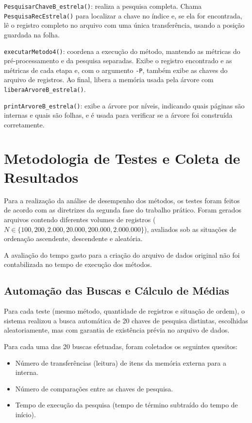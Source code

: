 \documentclass[12pt,a4paper]{article}
\begin{document}
\texttt{PesquisarChaveB\_estrela()}: realiza a pesquisa completa. Chama
\texttt{PesquisaRecEstrela()} para localizar a chave no índice e, se ela for
encontrada, lê o registro completo no arquivo com uma única transferência, usando a
posição guardada na folha.

\texttt{executarMetodo4()}: coordena a execução do método, mantendo as métricas do
pré-processamento e da pesquisa separadas. Exibe o registro encontrado e as métricas
de cada etapa e, com o argumento \texttt{-P}, também exibe as chaves do arquivo de
registros. Ao final, libera a memória usada pela árvore com
\texttt{liberaArvoreB\_estrela()}.

\texttt{printArvoreB\_estrela()}: exibe a árvore por níveis, indicando quais páginas são
internas e quais são folhas, e é usada para verificar se a árvore foi construída
corretamente.

\section{Metodologia de Testes e Coleta de Resultados}

Para a realização da análise de desempenho dos métodos, os testes foram feitos de acordo com as diretrizes da segunda fase do trabalho prático. Foram gerados arquivos contendo diferentes volumes de registros ($N \in \{100, 200, 2.000, 20.000, 200.000, 2.000.000\}$), avaliados sob as situações de ordenação ascendente, descendente e aleatória.

A avaliação do tempo gasto para a criação do arquivo de dados original não foi contabilizada no tempo de execução dos métodos.

\subsection{Automação das Buscas e Cálculo de Médias}

Para cada teste (mesmo método, quantidade de registros e situação de ordem), o sistema realizou a busca automática de 20 chaves de pesquisa distintas, escolhidas aleatoriamente, mas com garantia de existência prévia no arquivo de dados.

Para cada uma das 20 buscas efetuadas, foram coletados os seguintes quesitos:
\begin{itemize}
    \item Número de transferências (leitura) de itens da memória externa para a interna.
    \item Número de comparações entre as chaves de pesquisa.
    \item Tempo de execução da pesquisa (tempo de término subtraído do tempo de início).
\end{itemize}
\end{document}
